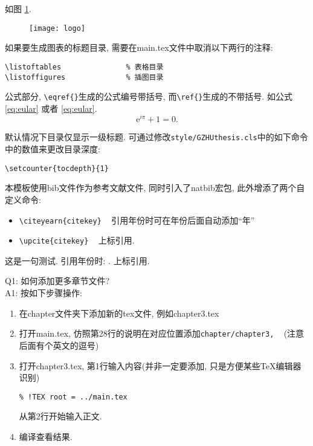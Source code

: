 如图 \ref{fig:logo}. 
\begin{figure}[h]
	\centering
	\texttt{[image: logo]}
	\label{fig:logo}
\end{figure}

如果要生成图表的标题目录, 需要在main.tex文件中取消以下两行的注释:
\begin{verbatim}
\listoftables               % 表格目录
\listoffigures              % 插图目录
\end{verbatim}

公式部分, \verb|\eqref{}|生成的公式编号带括号, 而\verb|\ref{}|生成的不带括号. 如公式 \ref{eq:eular} 或者 \eqref{eq:eular}.
\begin{equation}\label{eq:eular}
  \mathrm{e}^{i\pi}+1=0.
\end{equation}

默认情况下目录仅显示一级标题. 可通过修改\verb|style/GZHUthesis.cls|中的如下命令中的数值来更改目录深度:
\begin{verbatim}
\setcounter{tocdepth}{1} 
\end{verbatim}

本模板使用bib文件作为参考文献文件, 同时引入了natbib宏包, 此外增添了两个自定义命令:
\begin{itemize}
\item \verb|\citeyearn{citekey}|  ~  引用年份时可在年份后面自动添加``年''
\item \verb|\upcite{citekey}| ~ 上标引用.
\end{itemize}

这是一句测试\cite{Hazay_2010_Efficient}. 引用年份时: . 上标引用.

Q1: 如何添加更多章节文件?\\
A1: 按如下步骤操作:
\begin{enumerate}
\item 在chapter文件夹下添加新的tex文件, 例如chapter3.tex
\item 打开main.tex, 仿照第28行的说明在对应位置添加\verb|chapter/chapter3,| ~ (注意后面有个英文的逗号)
\item 打开chapter3.tex, 第1行输入内容(并非一定要添加, 只是方便某些TeX编辑器识别)
\begin{verbatim}
% !TEX root = ../main.tex
\end{verbatim}
从第2行开始输入正文.
\item 编译查看结果.
\end{enumerate}

